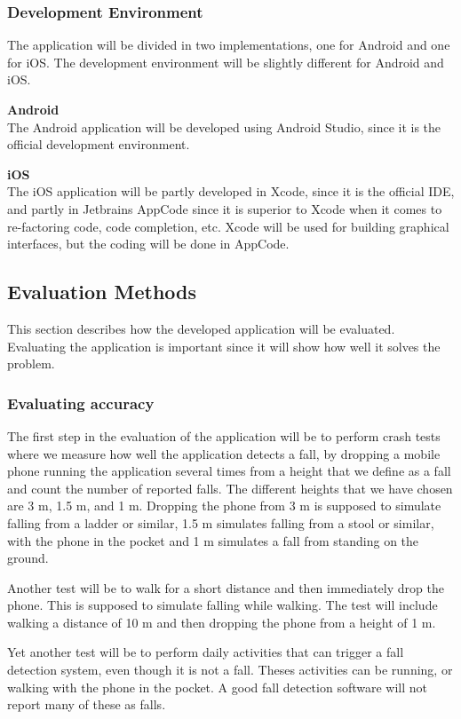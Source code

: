 \documentclass[12pt, a4paper, onecolumn]{article}
\newcommand{\parag}[1]{
	\textbf{#1} \hspace{0pt} \\
}
\begin{document}
	\subsubsection{Development Environment}
	
	The application will be divided in two implementations, one for Android and one for iOS. The development environment will be slightly different for Android and iOS. 
	
	\parag{Android}
	The Android application will be developed using Android Studio, since it is the official development environment.
	
	\parag{iOS}
	The iOS application will be partly developed in Xcode, since it is the official IDE, and partly in Jetbrains AppCode since it is superior to Xcode when it comes to re-factoring code, code completion, etc. Xcode will be used for building graphical interfaces, but the coding will be done in AppCode.
	
	\subsection{Evaluation Methods}
	
	This section describes how the developed application will be evaluated. Evaluating the application is important since it will show how well it solves the problem.
	
	\subsubsection{Evaluating accuracy}
	
	The first step in the evaluation of the application will be to perform crash tests where we measure how well the application detects a fall, by dropping a mobile phone running the application several times from a height that we define as a fall and count the number of reported falls. The different heights that we have chosen are 3 m, 1.5 m, and 1 m. Dropping the phone from 3 m is supposed to simulate falling from a ladder or similar, 1.5 m simulates falling from a stool or similar, with the phone in the pocket and 1 m simulates a fall from standing on the ground.
	
	Another test will be to walk for a short distance and then immediately drop the phone. This is supposed to simulate falling while walking. The test will include walking a distance of 10 m and then dropping the phone from a height of 1 m.
	
	Yet another test will be to perform daily activities that can trigger a fall detection system, even though it is not a fall. Theses activities can be running, or walking with the phone in the pocket. A good fall detection software will not report many of these as falls.
	
\end{document}
